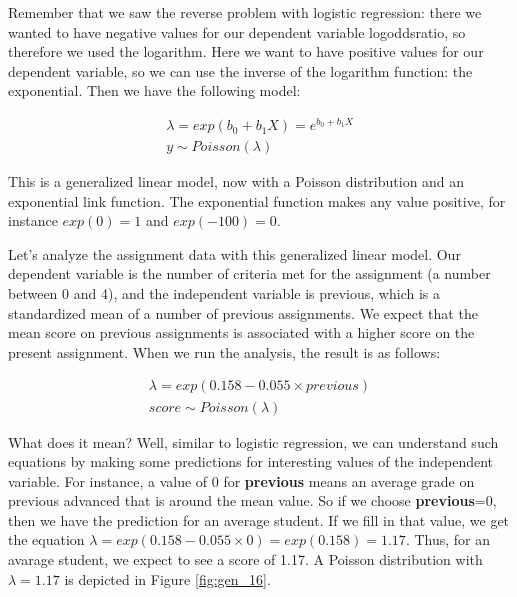 \documentclass[]{book}\usepackage[]{graphicx}\usepackage[]{color}
\begin{document}
Remember that we saw the reverse problem with logistic regression: there we wanted to have negative values for our dependent variable logoddsratio, so therefore we used the logarithm. Here we want to have positive values for our dependent variable, so we can use the inverse of the logarithm function: the exponential. Then we have the following model:


\begin{eqnarray}
\lambda = exp(b_0 + b_1 X)= e^{b_0+b_1X} \\
y \sim Poisson(\lambda)
\end{eqnarray}


This is a generalized linear model, now with a Poisson distribution and an exponential link function. The exponential function makes any value positive, for instance $exp(0)=1$ and $exp(-100)=0$.

Let's analyze the assignment data with this generalized linear model. Our dependent variable is the number of criteria met for the assignment (a number between 0 and 4), and the independent variable is previous, which is a standardized mean of a number of previous assignments. We expect that the mean score on previous assignments is associated with a higher score on the present assignment. When we run the analysis, the result is as follows:


\begin{eqnarray}
\lambda = exp(0.158 -0.055 \times previous) \\
score \sim Poisson(\lambda)
\end{eqnarray}

What does it mean? Well, similar to logistic regression, we can understand such equations by making some predictions for interesting values of the independent variable. For instance, a value of 0 for \textbf{previous} means an average grade on previous advanced that is around the mean value. So if we choose \textbf{previous}=0, then we have the prediction for an average student. If we fill in that value, we get the equation $\lambda=exp(0.158 -0.055 \times 0)= exp (0.158)= 1.17$. Thus, for an avarage student, we expect to see a score of 1.17. A Poisson distribution with $\lambda=1.17$ is depicted in Figure \ref{fig:gen_16}.
\end{document}
